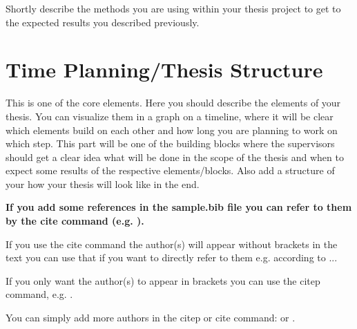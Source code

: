 \documentclass[11pt]{article}
\begin{document}
Shortly describe the methods you are using within your thesis project to get to the expected results you described previously.

\section{Time Planning/Thesis Structure}

This is one of the core elements. Here you should describe the elements of your thesis. You can visualize them in a graph on a timeline, where it will be clear which elements build on each other and how long you are planning to work on which step. This part will be one of the building blocks where the supervisors should get a clear idea what will be done in the scope of the thesis and when to expect some results of the respective elements/blocks. Also add a structure of your how your thesis will look like in the end.



\textbf{If you add some references in the sample.bib file you can refer to them by the cite command (e.g. \cite{moore2008defining}).}

If you use the cite command the author(s) will appear without brackets in the text you can use that if you want to directly refer to them e.g. according to \cite{almuhimedi2015your}...

If you only want the author(s) to appear in brackets you can use the citep command, e.g. \citep{almuhimedi2015your}.

You can simply add more authors in the citep or cite command: \citep{moore2008defining, almuhimedi2015your, decew2018conceptual} or \cite{moore2008defining, almuhimedi2015your, decew2018conceptual}. 



\end{document}
